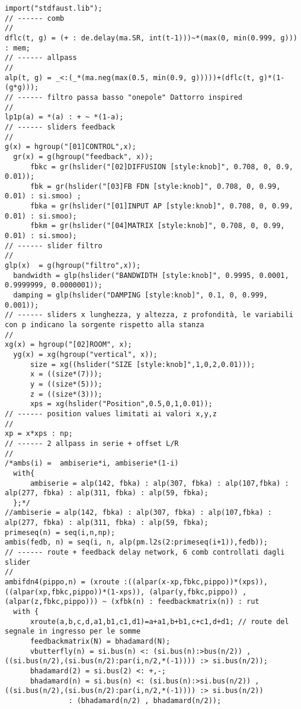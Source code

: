 \begin{lstlisting}
import("stdfaust.lib");
// ------ comb
//
dflc(t, g) = (+ : de.delay(ma.SR, int(t-1)))~*(max(0, min(0.999, g))) : mem;
// ------ allpass
//
alp(t, g) = _<:(_*(ma.neg(max(0.5, min(0.9, g)))))+(dflc(t, g)*(1-(g*g)));
// ------ filtro passa basso "onepole" Dattorro inspired
//
lp1p(a) = *(a) : + ~ *(1-a);
// ------ sliders feedback
//
g(x) = hgroup("[01]CONTROL",x);
  gr(x) = g(hgroup("feedback", x));
      fbkc = gr(hslider("[02]DIFFUSION [style:knob]", 0.708, 0, 0.9, 0.01));
      fbk = gr(hslider("[03]FB FDN [style:knob]", 0.708, 0, 0.99, 0.01) : si.smoo) ;
      fbka = gr(hslider("[01]INPUT AP [style:knob]", 0.708, 0, 0.99, 0.01) : si.smoo);
      fbkm = gr(hslider("[04]MATRIX [style:knob]", 0.708, 0, 0.99, 0.01) : si.smoo);
// ------ slider filtro
//
glp(x)  = g(hgroup("filtro",x));
  bandwidth = glp(hslider("BANDWIDTH [style:knob]", 0.9995, 0.0001, 0.9999999, 0.0000001));
  damping = glp(hslider("DAMPING [style:knob]", 0.1, 0, 0.999, 0.001));
// ------ sliders x lunghezza, y altezza, z profondità, le variabili con p indicano la sorgente rispetto alla stanza
//
xg(x) = hgroup("[02]ROOM", x);
  yg(x) = xg(hgroup("vertical", x));
      size = xg((hslider("SIZE [style:knob]",1,0,2,0.01)));
      x = ((size*(7)));
      y = ((size*(5)));
      z = ((size*(3)));
      xps = xg(hslider("Position",0.5,0,1,0.01));
// ------ position values limitati ai valori x,y,z
//
xp = x*xps : np;
// ------ 2 allpass in serie + offset L/R
//
/*ambs(i) =  ambiserie*i, ambiserie*(1-i)
  with{
      ambiserie = alp(142, fbka) : alp(307, fbka) : alp(107,fbka) : alp(277, fbka) : alp(311, fbka) : alp(59, fbka);
  };*/
//ambiserie = alp(142, fbka) : alp(307, fbka) : alp(107,fbka) : alp(277, fbka) : alp(311, fbka) : alp(59, fbka);
primeseq(n) = seq(i,n,np);
ambis(fedb, n) = seq(i, n, alp(pm.l2s(2:primeseq(i+1)),fedb));
// ------ route + feedback delay network, 6 comb controllati dagli slider
//
ambifdn4(pippo,n) = (xroute :((alpar(x-xp,fbkc,pippo))*(xps)), ((alpar(xp,fbkc,pippo))*(1-xps)), (alpar(y,fbkc,pippo)) , (alpar(z,fbkc,pippo))) ~ (xfbk(n) : feedbackmatrix(n)) : rut
  with {
      xroute(a,b,c,d,a1,b1,c1,d1)=a+a1,b+b1,c+c1,d+d1; // route del segnale in ingresso per le somme
      feedbackmatrix(N) = bhadamard(N);
      vbutterfly(n) = si.bus(n) <: (si.bus(n):>bus(n/2)) , ((si.bus(n/2),(si.bus(n/2):par(i,n/2,*(-1)))) :> si.bus(n/2));
      bhadamard(2) = si.bus(2) <: +,-;
      bhadamard(n) = si.bus(n) <: (si.bus(n):>si.bus(n/2)) , ((si.bus(n/2),(si.bus(n/2):par(i,n/2,*(-1)))) :> si.bus(n/2))
               : (bhadamard(n/2) , bhadamard(n/2));

\end{lstlisting}
